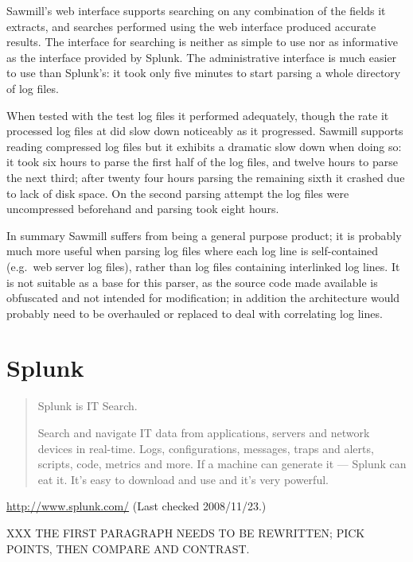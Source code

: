 Sawmill's web interface supports searching on any combination of the fields
it extracts, and searches performed using the web interface produced
accurate results.  The interface for searching is neither as simple to use
nor as informative as the interface provided by Splunk.  The administrative
interface is much easier to use than Splunk's: it took only five minutes to
start parsing a whole directory of log files.  

When tested with the \numberOFlogFILES{} test log files it performed
adequately, though the rate it processed log files at did slow down
noticeably as it progressed.  Sawmill supports reading compressed log files
but it exhibits a dramatic slow down when doing so: it took six hours to
parse the first half of the log files, and twelve hours to parse the next
third; after twenty four hours parsing the remaining sixth it crashed due
to lack of disk space.  On the second parsing attempt the log files were
uncompressed beforehand and parsing took eight hours.

In summary Sawmill suffers from being a general purpose product; it is
probably much more useful when parsing log files where each log line is
self-contained (e.g.\ web server log files), rather than log files
containing interlinked log lines.  It is not suitable as a base for this
parser, as the source code made available is obfuscated and not intended
for modification; in addition the architecture would probably need to be
overhauled or replaced to deal with correlating log lines.

\section{Splunk}

\begin{quotation}

    Splunk is IT Search.

    Search and navigate IT data from applications, servers and network
    devices in real-time. Logs, configurations, messages, traps and alerts,
    scripts, code, metrics and more. If a machine can generate it ---
    Splunk can eat it. It's easy to download and use and it's very
    powerful.

\end{quotation}

\noindent{}\url{http://www.splunk.com/} \newline{}
(Last checked 2008/11/23.)

XXX THE FIRST PARAGRAPH NEEDS TO BE REWRITTEN\@; PICK POINTS, THEN COMPARE
AND CONTRAST\@.

